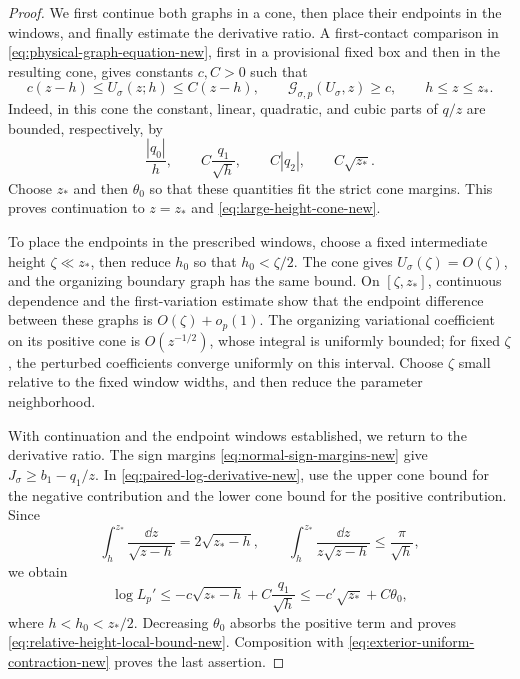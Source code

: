 \begin{proof}
We first continue both graphs in a cone, then place their endpoints in
the windows, and finally estimate the derivative ratio. A first-contact
comparison in
\eqref{eq:physical-graph-equation-new}, first in a provisional fixed box
and then in the resulting cone, gives constants $c,C>0$ such that
\begin{equation}
\label{eq:large-height-cone-new}
 c(z-h)\le U_\sigma(z;h)\le C(z-h),\qquad
 \mathcal G_{\sigma,p}(U_\sigma,z)\ge c,
 \qquad h\le z\le z_*.
\end{equation}
Indeed, in this cone the constant, linear, quadratic, and cubic parts of
$q/z$ are bounded, respectively, by
\[
 \frac{|q_0|}{h},\qquad
 C\frac{q_1}{\sqrt h},\qquad
 C|q_2|,\qquad C\sqrt{z_*}.
\]
Choose $z_*$ and then $\theta_0$ so that these quantities fit the strict
cone margins. This proves continuation to $z=z_*$ and
\eqref{eq:large-height-cone-new}.

To place the endpoints in the prescribed windows, choose a fixed
intermediate height \(\zeta\ll z_*\), then reduce \(h_0\) so that
\(h_0<\zeta/2\). The cone gives \(U_\sigma(\zeta)=O(\zeta)\),
and the organizing boundary graph has the same bound. On
\([\zeta,z_*]\), continuous dependence and the first-variation
estimate show that the endpoint difference between these graphs is
\(O(\zeta)+o_p(1)\). The organizing variational coefficient on its
positive cone is \(O(z^{-1/2})\), whose integral is uniformly bounded;
for fixed \(\zeta\), the perturbed coefficients converge uniformly on
this interval. Choose \(\zeta\) small relative to the fixed window
widths, and then reduce the parameter neighborhood.

With continuation and the endpoint windows established, we return to
the derivative ratio. The sign margins \eqref{eq:normal-sign-margins-new} give
$J_\sigma\ge b_1-q_1/z$.
In \eqref{eq:paired-log-derivative-new}, use the upper cone bound for
the negative contribution and the lower cone bound for the positive
contribution. Since
\[
 \int_h^{z_*}\frac{\dd z}{\sqrt{z-h}}=2\sqrt{z_*-h},
 \qquad
 \int_h^{z_*}\frac{\dd z}{z\sqrt{z-h}}
 \le\frac{\pi}{\sqrt h},
\]
we obtain
\begin{equation}
\label{eq:relative-height-log-bound-new}
 \log L_p'
 \le-c\sqrt{z_*-h}+C\frac{q_1}{\sqrt h}
 \le-c'\sqrt{z_*}+C\theta_0,
\end{equation}
where $h<h_0<z_*/2$. Decreasing $\theta_0$ absorbs the positive term and proves
\eqref{eq:relative-height-local-bound-new}.  Composition with
\eqref{eq:exterior-uniform-contraction-new} proves the last assertion.
\end{proof}

